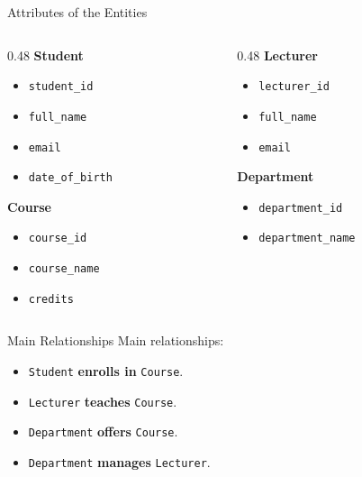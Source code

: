 \documentclass[aspectratio=169,11pt]{beamer}
\newcommand{\keyword}[1]{\textcolor{accent}{\textbf{#1}}}
\newcommand{\kw}[1]{\keyword{#1}}
\newcommand{\smallitem}{\setlength{\itemsep}{2pt}\setlength{\parskip}{0pt}}
\begin{document}
\begin{frame}{Attributes of the Entities}
\scriptsize
\begin{columns}[T]
\begin{column}{0.48\textwidth}
\textbf{Student}
\begin{itemize}
\smallitem
  \item \texttt{student\_id}
  \item \texttt{full\_name}
  \item \texttt{email}
  \item \texttt{date\_of\_birth}
\end{itemize}

\textbf{Course}
\begin{itemize}
\smallitem
  \item \texttt{course\_id}
  \item \texttt{course\_name}
  \item \texttt{credits}
\end{itemize}
\end{column}
\begin{column}{0.48\textwidth}
\textbf{Lecturer}
\begin{itemize}
\smallitem
  \item \texttt{lecturer\_id}
  \item \texttt{full\_name}
  \item \texttt{email}
\end{itemize}

\textbf{Department}
\begin{itemize}
\smallitem
  \item \texttt{department\_id}
  \item \texttt{department\_name}
\end{itemize}
\end{column}
\end{columns}
\end{frame}

\begin{frame}{Main Relationships}
\small
Main relationships:
\begin{itemize}
\smallitem
  \item \texttt{Student} \kw{enrolls in} \texttt{Course}.
  \item \texttt{Lecturer} \kw{teaches} \texttt{Course}.
  \item \texttt{Department} \kw{offers} \texttt{Course}.
  \item \texttt{Department} \kw{manages} \texttt{Lecturer}.
\end{itemize}
\end{frame}
\end{document}
